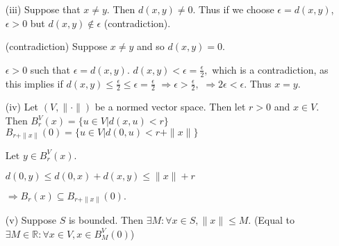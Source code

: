 \documentclass{article}
\theoremstyle{definition}
\numberwithin{equation}{section}
\begin{document}
\begin{enumerate}
    \item[(iii)] Suppose that \( x \neq y \). Then \( d(x, y) \neq 0 \). Thus if we choose \( \epsilon = d(x, y) \), \( \epsilon > 0 \) but \( d(x, y) \notin \epsilon \) (contradiction).

    \item[(contradiction)] Suppose \( x \neq y \) and so \( d(x,y) = 0 \).

     \(\epsilon > 0\) such that \( \epsilon = d(x,y) \). 
    $
    d(x, y) < \epsilon = \frac{\epsilon}{2}, 
    $ 
    which is a contradiction, as this implies if \( d(x, y) \leq \frac{\epsilon}{2} \leq \epsilon = \frac{\epsilon}{2} \)
    $
    \Rightarrow \epsilon > \frac{\epsilon}{2}, 
    $
    $
    \Rightarrow 2 \epsilon < \epsilon.
    $
    Thus \(x = y\).

    \item[(iv)] Let \( (V, \|\cdot\|) \) be a normed vector space. Then let \( r > 0 \) and \( x \in V \). Then
    $
    B_r^V(x) = \{u \in V | d(x, u) < r \}
    $
    $
    B_{r+\|x\|}(0) = \{u \in V | d(0, u) < r + \|x\| \}
    $

    $
    \text{Let } y \in B_r^V(x). 
    $

    $
    d(0, y) \leq d(0, x) + d(x, y) \leq \| x \| + r 
    $

    $
    \Rightarrow B_r(x) \subseteq B_{r + \| x \|}(0).
    $

    \item[(v)] Suppose \( S \) is bounded. Then
    $
    \exists M : \forall x \in S, \| x \| \leq M.
    $
    (Equal to \( \exists M \in \mathbb{R} : \forall x \in V, x \in B_M^V(0) \))
\end{enumerate}
\end{document}
